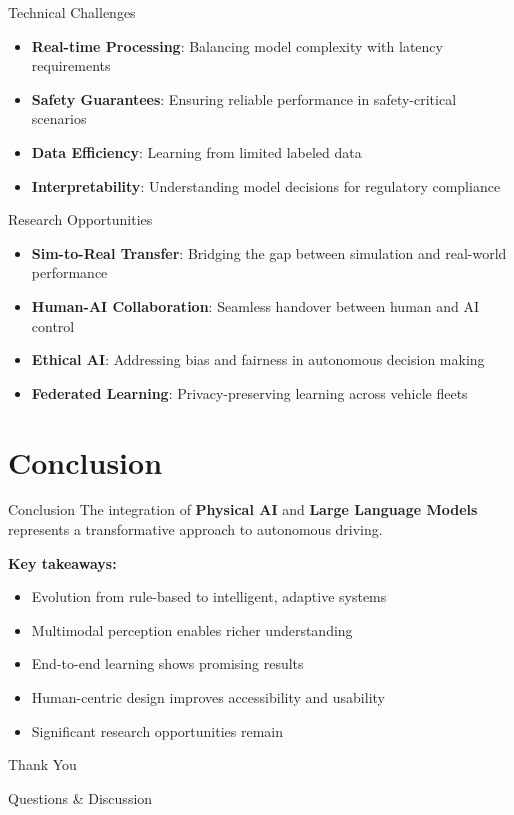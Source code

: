 \documentclass[aspectratio=169]{beamer}
\newcommand{\highlight}[1]{\textcolor{teslaBlue}{\textbf{#1}}}
\begin{document}
\begin{frame}{Technical Challenges}
    \begin{itemize}
        \item \textbf{Real-time Processing}: Balancing model complexity with latency requirements
        \item \textbf{Safety Guarantees}: Ensuring reliable performance in safety-critical scenarios
        \item \textbf{Data Efficiency}: Learning from limited labeled data
        \item \textbf{Interpretability}: Understanding model decisions for regulatory compliance
    \end{itemize}
\end{frame}

\begin{frame}{Research Opportunities}
    \begin{itemize}
        \item \textbf{Sim-to-Real Transfer}: Bridging the gap between simulation and real-world performance
        \item \textbf{Human-AI Collaboration}: Seamless handover between human and AI control
        \item \textbf{Ethical AI}: Addressing bias and fairness in autonomous decision making
        \item \textbf{Federated Learning}: Privacy-preserving learning across vehicle fleets
    \end{itemize}
\end{frame}

\section{Conclusion}

\begin{frame}{Conclusion}
    The integration of \highlight{Physical AI} and \highlight{Large Language Models} represents a transformative approach to autonomous driving.
    
    \vspace{0.5cm}
    \textbf{Key takeaways:}
    \begin{itemize}
        \item Evolution from rule-based to intelligent, adaptive systems
        \item Multimodal perception enables richer understanding
        \item End-to-end learning shows promising results
        \item Human-centric design improves accessibility and usability
        \item Significant research opportunities remain
    \end{itemize}
\end{frame}

\begin{frame}
    \begin{center}
        \Huge Thank You
        
        \vspace{1cm}
        \Large Questions \& Discussion
    \end{center}
\end{frame}
\end{document}

